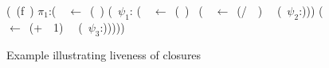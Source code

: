 \begin{wrapfigure}{l}{0.25\textwidth}
{%
  \renewcommand{\arraystretch}{.8}{
    \begin{uprogram}
      \UFL (\DEFINE~(f~\px)
       $\pi_1$:(\LET~\py~$\leftarrow $\
      (\length~\px) \IN
       (\SIF~$\psi_1$:\py
      (\LET~\pu~$\leftarrow$~(\Sum~\px)~\IN
       (\LET~\pw~$\leftarrow$\ (/~\pu~\py)~\IN\  (\SRETURN~$\psi_2$:\pw)))
      \UNL{5}(\LET~\pz~$\leftarrow$~(+~\py~1)~\IN\ \UNL{6} (\SRETURN~$\psi_3$:\pz)))))   
  \end{uprogram}}
}
\caption{Example illustrating liveness of closures}\label{fig:lv-closure}
\vspace*{.1cm}
\end{wrapfigure}
